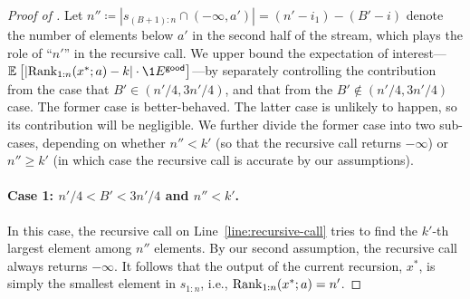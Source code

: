 \begin{proof}[Proof of ]
Let $n'' \coloneqq |s_{(B+1):n} \cap (-\infty, a')| = (n' - i_1) - (B' - i)$ denote the number of elements below $a'$ in the second half of the stream, which plays the role of ``$n'$'' in the recursive call. We upper bound the expectation of interest---$\Ex{}{\left|\rank_{{1:n}}(x^*; a) - k\right|\cdot \1{\goodevent}}$---by separately controlling the contribution from the case that $B' \in (n'/4, 3n'/4)$, and that from the $B' \notin (n'/4, 3n'/4)$ case. The former case is better-behaved. The latter case is unlikely to happen, so its contribution will be negligible. We further divide the former case into two sub-cases, depending on whether $n'' < k'$ (so that the recursive call returns $-\infty$) or $n'' \ge k'$ (in which case the recursive call is accurate by our assumptions).

\paragraph{Case 1: $n'/4<B'<3n'/4$ and $n'' < k'$.} In this case, the recursive call on Line~\ref{line:recursive-call} tries to find the $k'$-th largest element among $n''$ elements. By our second assumption, the recursive call always returns $-\infty$. It follows that the output of the current recursion, $x^*$, is simply the smallest element in $s_{1:n}$, i.e., $\mathrm{Rank}_{1:n}(x^*; a) = n'$. 


\end{proof}
